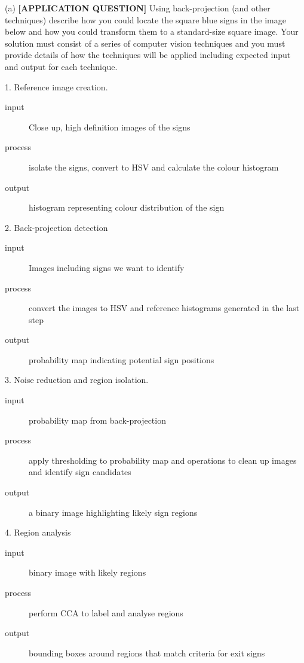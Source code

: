 \newpage
{}
\begin{tcolorbox}[title=Question]
  (a) \textbf{[APPLICATION QUESTION]} Using back-projection (and other techniques) describe how you could locate the square blue signs in the image below and how you could transform them to a standard-size square image. Your solution must consist of a series of computer vision techniques and you must provide details of how the techniques will be applied including expected input and output for each technique.
  \begin{flushright}
    [25 marks]
  \end{flushright}
\end{tcolorbox}
1. Reference image creation.
\begin{description}
  \item[input] Close up, high definition images of the signs
  \item[process] isolate the signs, convert to HSV and calculate the colour histogram
  \item[output] histogram representing colour distribution of the sign
\end{description}
2. Back-projection detection
\begin{description}
  \item[input] Images including signs we want to identify
  \item[process] convert the images to HSV and reference histograms generated in the last step
  \item[output] probability map indicating potential sign positions
\end{description}
3. Noise reduction and region isolation.
\begin{description}
  \item[input] probability map from back-projection
  \item[process] apply thresholding to probability map and operations to clean up images and identify sign candidates
  \item[output] a binary image highlighting likely sign regions
\end{description}
4. Region analysis
\begin{description}
  \item[input] binary image with likely regions
  \item[process] perform CCA to label and analyse regions
  \item[output] bounding boxes around regions that match criteria for exit signs 
\end{description}
